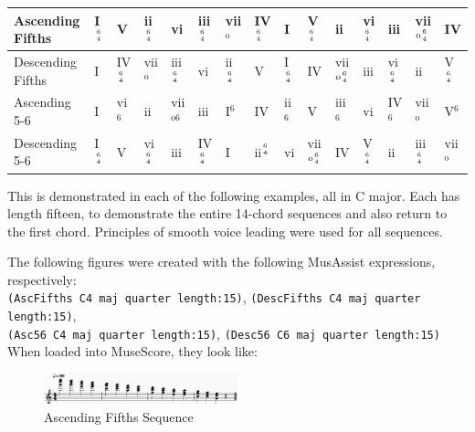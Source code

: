 \documentclass{report}
\begin{document}
\begin{table}[h!]
\begin{tabular}{|l|llllllllllllll|}
\hline
Ascending Fifths  & I$^{6 \atop 4}$ & V                & ii$^{6 \atop 4}$ & vi                & iii$^{6 \atop 4}$ & vii$^\text{o}$   & IV$^{6 \atop 4}$ & I               & V$^{6 \atop 4}$             & ii                          & vi$^{6 \atop 4}$ & iii              & vii$^{\text{o}{6 \atop 4}}$ & IV              \\ \hline
Descending Fifths & I               & IV$^{6 \atop 4}$ & vii$^\text{o}$   & iii$^{6 \atop 4}$ & vi                & ii$^{6 \atop 4}$ & V                & I$^{6 \atop 4}$ & IV                          & vii$^{\text{o}{6 \atop 4}}$ & iii              & vi$^{6 \atop 4}$ & ii                          & V$^{6 \atop 4}$ \\ \hline
Ascending 5-6     & I               & vi$^6$           & ii               & vii$^{\text{o}6}$ & iii               & I$^6$            & IV               & ii$^6$          & V                           & iii$^6$                     & vi               & IV$^6$           & vii$^\text{o}$              & V$^6$           \\ \hline
Descending 5-6    & I$^{6 \atop 4}$ & V                & vi$^{6 \atop 4}$ & iii & IV$^{6 \atop 4}$  & I                & ii$^{6 \atop 4}$ & vi              & vii$^{\text{o}{6 \atop 4}}$ & IV                          & V$^{6 \atop 4}$  & ii               & iii$^{6 \atop 4}$           & vii$^\text{o}$  \\ \hline
\end{tabular}
\end{table}

This is demonstrated in each of the following examples, all in C major. Each has length fifteen, to demonstrate the entire 14-chord sequences and also return to the first chord. Principles of smooth voice leading were used for all sequences.

The following figures were created with the following MusAssist expressions, respectively: \\\verb.(AscFifths C4 maj quarter length:15)., \verb.(DescFifths C4 maj quarter length:15)., \\\verb.(Asc56 C4 maj quarter length:15)., \verb.(Desc56 C6 maj quarter length:15). When loaded into MuseScore, they look like:

\begin{figure}[h!]
\centering
\includegraphics[width=0.5\textwidth]{images/ascfifths}
  \caption{Ascending Fifths Sequence}
\end{figure}
\end{document}
